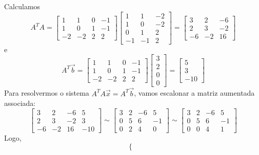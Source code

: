 \documentclass[../livro.tex]{subfiles}  %
\begin{document}
\begin{example}\label{exp:minquad2}
  Calculamos
  \[
  A^T A =
  \begin{bmatrix}
    1 & 1 & 0 & -1 \\ 1 & 0 & 1 & -1 \\ -2 & -2 & 2 & 2
  \end{bmatrix}
  \begin{bmatrix}
    1 & 1 & -2 \\ 1 & 0 & -2 \\ 0 & 1 & 2 \\ -1 & -1 & 2
  \end{bmatrix} =
  \begin{bmatrix}
    3 & 2 & -6 \\ 2 & 3 & -2 \\ -6 & -2 & 16
  \end{bmatrix}
  \] e
  \[
  A^T \vec{b} =
  \begin{bmatrix}
    1 & 1 & 0 & -1 \\ 1 & 0 & 1 & -1 \\ -2 & -2 & 2 & 2
  \end{bmatrix}
  \begin{bmatrix}
    3 \\ 2 \\ 0 \\ 0
  \end{bmatrix} =
  \begin{bmatrix}
    5 \\ 3 \\ -10
  \end{bmatrix}
  \] Para resolvermos o sistema $A^TA\vec{x} = A^T\vec{b}$, vamos escalonar a matriz aumentada associada:
  \[
  \begin{bmatrix}
    3 & 2 & -6 & 5 \\
    2 & 3 & -2 & 3 \\
    -6 & -2 & 16 & -10
  \end{bmatrix} \sim
  \begin{bmatrix}
    3 & 2 & -6 & 5 \\
    0 & 5 &  6 & -1 \\
    0 & 2 &  4 & 0
  \end{bmatrix} \sim
  \begin{bmatrix}
    3 & 2 & -6 & 5 \\
    0 & 5 &  6 & -1 \\
    0 & 0 &  4 & 1
  \end{bmatrix}
  \] Logo,
  \[
  \left\{
    \begin{array}{ll}

\end{array}\]
\end{example}
\end{document}
